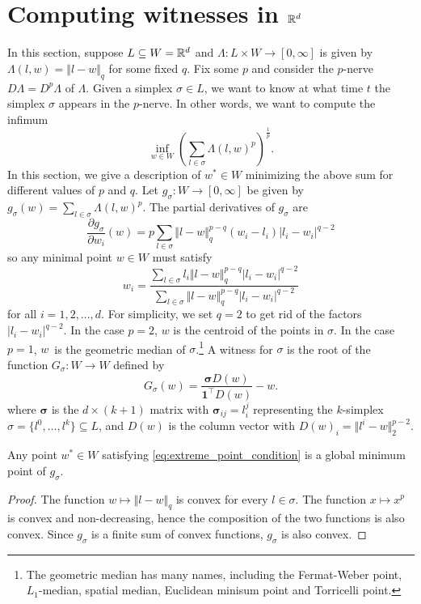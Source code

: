 	\section{Computing witnesses in $\mathbb{R}^d$}
	In this section, suppose $L\subseteq W=\mathbb{R}^d$ and $\Lambda\colon L\times W\to [0,\infty]$ is given by $\Lambda(l,w)=\Vert l-w\Vert_q$ for some fixed $q$. Fix some $p$ and consider the $p$-nerve $D\Lambda=D^p\Lambda$ of $\Lambda$. Given a simplex $\sigma\in L$, we want to know at what time $t$ the simplex $\sigma$ appears in the $p$-nerve. In other words, we want to compute the infimum
	$$
	\inf_{w\in W}\left(\sum_{l\in\sigma}\Lambda(l,w)^p\right)^{\frac{1}{p}}.
	$$
	In this section, we give a description of $w^*\in W$ minimizing the above sum for different values of $p$ and $q$. Let $g_\sigma\colon W\to[0,\infty]$ be given by $g_\sigma(w)=\sum_{l\in\sigma}\Lambda(l,w)^p$. The partial derivatives of $g_\sigma$ are 
	$$
	\frac{\partial g_\sigma}{\partial w_i}(w)=p\sum_{l\in\sigma}\Vert l-w\Vert_q^{p-q}(w_i-l_i)|l_i-w_i|^{q-2}
	$$
	so any minimal point $w\in W$ must satisfy
	\begin{equation}
	w_i = \frac{\sum_{l\in\sigma}l_i\Vert l-w\Vert_q^{p-q}|l_i-w_i|^{q-2}}{\sum_{l\in\sigma}\Vert l-w\Vert_q^{p-q}|l_i-w_i|^{q-2}}
	\label{eq:extreme_point_condition}
	\end{equation}
	for all $i=1,2,\ldots, d$. For simplicity, we set $q=2$ to get rid of the factors $|l_i-w_i|^{q-2}$. In the case $p=2$, $w$ is the centroid of the points in $\sigma$. In the case $p=1$, $w$ is the geometric median of $\sigma$.\footnote{The geometric median has many names, including the Fermat-Weber point, $L_1$-median, spatial median, Euclidean minisum point and Torricelli point.} A witness for $\sigma$ is the root of the function $G_\sigma\colon W\to W$ defined by
	$$
	G_\sigma(w)=\frac{\boldsymbol{\sigma}D(w)}{\mathbf{1}^\top D(w)}-w.
	$$
	where $\boldsymbol{\sigma}$ is the $d\times(k+1)$ matrix with $\boldsymbol{\sigma}_{ij}=l^j_i$ representing the $k$-simplex $\sigma=\{l^0,\ldots,l^k\}\subseteq L$, and $D(w)$ is the column vector with $D(w)_i=\Vert l^i - w\Vert^{p-2}_2$.
	
	\begin{prop}
		Any point $w^*\in W$ satisfying \cref{eq:extreme_point_condition} is a global minimum point of $g_\sigma$.
	\end{prop}
	\begin{proof}
		The function $w\mapsto\Vert l-w\Vert_q$ is convex for every $l\in\sigma$. The function $x\mapsto x^p$ is convex and non-decreasing, hence the composition of the two functions is also convex. Since $g_\sigma$ is a finite sum of convex functions, $g_\sigma$ is also convex.
	\end{proof}

